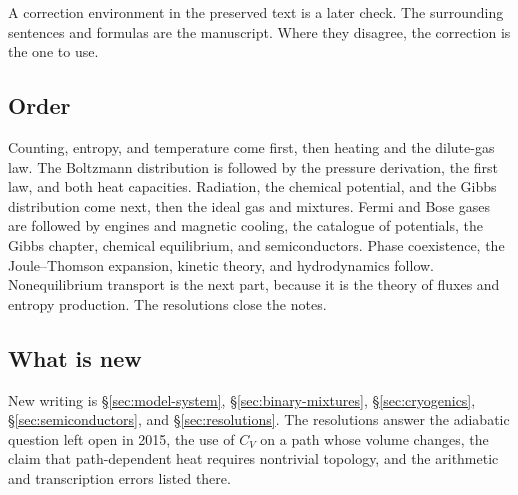 A correction environment in the preserved text is a later check. The surrounding sentences and formulas are the manuscript. Where they disagree, the correction is the one to use.

\subsection{Order}

Counting, entropy, and temperature come first, then heating and the dilute-gas law. The Boltzmann distribution is followed by the pressure derivation, the first law, and both heat capacities. Radiation, the chemical potential, and the Gibbs distribution come next, then the ideal gas and mixtures. Fermi and Bose gases are followed by engines and magnetic cooling, the catalogue of potentials, the Gibbs chapter, chemical equilibrium, and semiconductors. Phase coexistence, the Joule--Thomson expansion, kinetic theory, and hydrodynamics follow. Nonequilibrium transport is the next part, because it is the theory of fluxes and entropy production. The resolutions close the notes.

\subsection{What is new}

New writing is \S\ref{sec:model-system}, \S\ref{sec:binary-mixtures}, \S\ref{sec:cryogenics}, \S\ref{sec:semiconductors}, and \S\ref{sec:resolutions}. The resolutions answer the adiabatic question left open in 2015, the use of \(C_V\) on a path whose volume changes, the claim that path-dependent heat requires nontrivial topology, and the arithmetic and transcription errors listed there.
